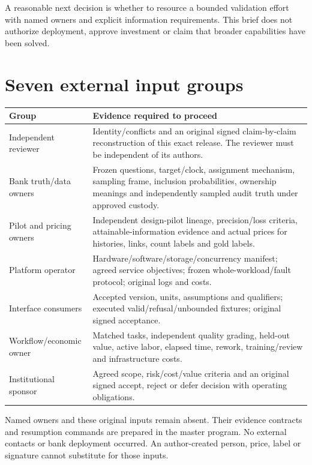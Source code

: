 \documentclass[11pt,a4paper]{article}
\begin{document}
A reasonable next decision is whether to resource a bounded validation effort with named owners and explicit information requirements. This brief does not authorize deployment, approve investment or claim that broader capabilities have been solved.

\newpage
\section*{Seven external input groups}
\begin{tabular}{@{}>{\raggedright\arraybackslash}p{}>{\raggedright\arraybackslash}p{}@{}}\toprule
Group & Evidence required to proceed\\\midrule
Independent reviewer & Identity/conflicts and an original signed claim-by-claim reconstruction of this exact release. The reviewer must be independent of its authors.\\[6pt]
Bank truth/data owners & Frozen questions, target/clock, assignment mechanism, sampling frame, inclusion probabilities, ownership meanings and independently sampled audit truth under approved custody.\\[6pt]
Pilot and pricing owners & Independent design-pilot lineage, precision/loss criteria, attainable-information evidence and actual prices for histories, links, count labels and gold labels.\\[6pt]
Platform operator & Hardware/software/storage/concurrency manifest; agreed service objectives; frozen whole-workload/fault protocol; original logs and costs.\\[6pt]
Interface consumers & Accepted version, units, assumptions and qualifiers; executed valid/refusal/unbounded fixtures; original signed acceptance.\\[6pt]
Workflow/economic owner & Matched tasks, independent quality grading, held-out value, active labor, elapsed time, rework, training/review and infrastructure costs.\\[6pt]
Institutional sponsor & Agreed scope, risk/cost/value criteria and an original signed accept, reject or defer decision with operating obligations.\\\bottomrule
\end{tabular}

Named owners and these original inputs remain absent. Their evidence contracts and resumption commands are prepared in the master program. No external contacts or bank deployment occurred. An author-created person, price, label or signature cannot substitute for those inputs.
\end{document}
